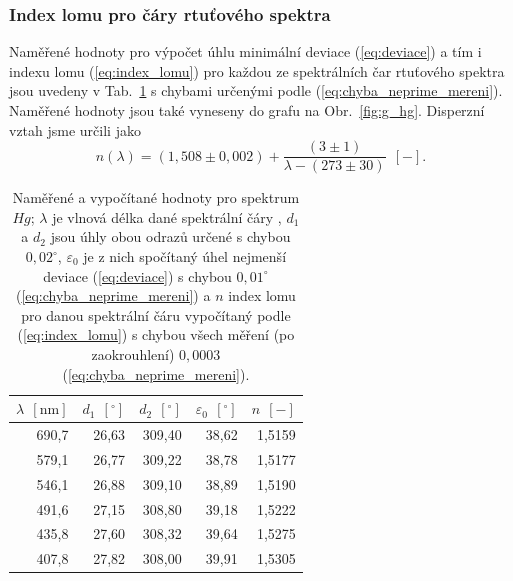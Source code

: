 \documentclass[english]{article}
\newcommand{\unit}[1]{\ \mathrm{#1}}
\begin{document}
		
		\subsubsection{Index lomu pro čáry rtuťového spektra}
			Naměřené hodnoty pro výpočet úhlu minimální deviace (\ref{eq:deviace}) a tím i indexu lomu (\ref{eq:index_lomu}) pro každou ze spektrálních čar rtuťového spektra jsou uvedeny v Tab.~\ref{tab:hg} s chybami určenými podle (\ref{eq:chyba_neprime_mereni}). Naměřené hodnoty jsou také vyneseny do grafu na Obr.~\ref{fig:g_hg}. Disperzní vztah jsme určili jako 
			\begin{equation}
				n(\lambda)=(1,508\pm0,002)+\frac{(3\pm1)}{\lambda-(273\pm30)}~\unit{[-]}.
				\label{eq:disperzni_vztah}
			\end{equation}
			
			\begin{table}[htbp]
			  \centering
    \begin{tabular}{|r|r|r|r|r|}
    \hline
    \boldmath{}\textbf{$\lambda~\unit{[nm]}$}\unboldmath{} & \boldmath{}\textbf{$d_1~\unit{[^\circ]}$}\unboldmath{} & \boldmath{}\textbf{$d_2~\unit{[^\circ]}$}\unboldmath{} & \boldmath{}\textbf{$\varepsilon_0~\unit{[^\circ]}$}\unboldmath{} & \boldmath{}\textbf{$n~\unit{[-]}$}\unboldmath{} \bigstrut\\
    \hline
    690,7 & 26,63 & 309,40 & 38,62 & 1,5159 \bigstrut\\
    \hline
    579,1 & 26,77 & 309,22 & 38,78 & 1,5177 \bigstrut\\
    \hline
    546,1 & 26,88 & 309,10 & 38,89 & 1,5190 \bigstrut\\
    \hline
    491,6 & 27,15 & 308,80 & 39,18 & 1,5222 \bigstrut\\
    \hline
    435,8 & 27,60 & 308,32 & 39,64 & 1,5275 \bigstrut\\
    \hline
    407,8 & 27,82 & 308,00 & 39,91 & 1,5305 \bigstrut\\
    \hline
    \end{tabular}%

			    \caption{Naměřené a vypočítané hodnoty pro spektrum $Hg$; $\lambda$ je vlnová délka dané spektrální čáry \cite{bib:na_miste}, $d_1$ a $d_2$ jsou úhly obou odrazů určené s chybou $0,02^\circ$, $\varepsilon_0$ je z nich spočítaný úhel nejmenší deviace (\ref{eq:deviace}) s chybou $0,01^\circ$ (\ref{eq:chyba_neprime_mereni}) a $n$ index lomu pro danou spektrální čáru vypočítaný podle (\ref{eq:index_lomu}) s chybou všech měření (po zaokrouhlení) $0,0003$ (\ref{eq:chyba_neprime_mereni}).}
			  \label{tab:hg}%
			\end{table}%
			
\end{document}
